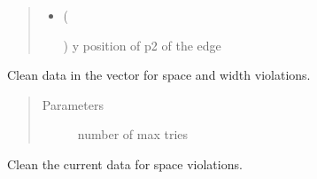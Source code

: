 \documentclass[a4paper,10pt,english]{sphinxmanual}
\begin{document}
\begin{fulllineitems}
\begin{fulllineitems}
\begin{quote}
\begin{description}
\begin{itemize}
\item {} 
 (%
\begin{footnote}[11]\sphinxAtStartFootnote
{}
%
\end{footnote}) \textendash{} y position of p2 of the edge

\end{itemize}

\end{description}\end{quote}

\end{fulllineitems}


\begin{fulllineitems}
\label{\detokenize{drc/drc:kppc.drc.kppc.drc.slcleaner.PyDrcSl.clean}}
Clean data in the vector for space and width violations.
\begin{quote}\begin{description}
\item[{Parameters}] \leavevmode
{} \textendash{} number of max tries

\end{description}\end{quote}

\end{fulllineitems}


\begin{fulllineitems}
\label{\detokenize{drc/drc:kppc.drc.kppc.drc.slcleaner.PyDrcSl.clean_space}}
Clean the current data for space violations.

\end{fulllineitems}



\end{fulllineitems}
\end{document}

